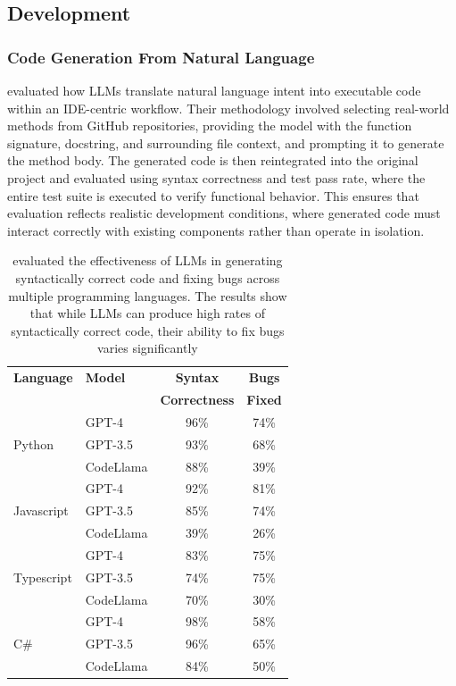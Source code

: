 \subsection{Development}
\subsubsection{Code Generation From Natural Language}
\citet{stages_dev_agarwal2024copilot} evaluated how LLMs translate natural language intent into executable code within an IDE-centric workflow. Their methodology involved selecting real-world methods from GitHub repositories, providing the model with the function signature, docstring, and surrounding file context, and prompting it to generate the method body. The generated code is then reintegrated into the original project and evaluated using syntax correctness and test pass rate, where the entire test suite is executed to verify functional behavior. This ensures that evaluation reflects realistic development conditions, where generated code must interact correctly with existing components rather than operate in isolation.
\begin{table}
    \centering
    \begin{tabular}{@{}llcc@{}}
        \\
        \toprule
        \textbf{Language}           & \textbf{Model} & \textbf{Syntax }     & \textbf{Bugs}  \\
                                    &                & \textbf{Correctness} & \textbf{Fixed} \\
        \toprule
        \multirow{3}{*}{Python}     & GPT-4          & 96\%                 & 74\%           \\&  GPT-3.5& 93\% & 68\%\\&CodeLlama & 88\% & 39\%\\
        \toprule
        \multirow{3}{*}{Javascript} & GPT-4          & 92\%                 & 81\%           \\&  GPT-3.5 & 85\% & 74\%\\&CodeLlama & 39\% & 26\%\\
        \toprule
        \multirow{3}{*}{Typescript} & GPT-4          & 83\%                 & 75\%           \\&  GPT-3.5 & 74\% & 75\%\\&CodeLlama & 70\% & 30\%\\
        \toprule
        \multirow{3}{*}{C\#}        & GPT-4          & 98\%                 & 58\%           \\&  GPT-3.5  & 96\% & 65\%\\&CodeLlama  & 84\% & 50\%\\
        \bottomrule
    \end{tabular}
    \caption{\citet{stages_dev_agarwal2024copilot} evaluated the effectiveness of LLMs in generating syntactically correct code and fixing bugs across multiple programming languages. The results show that while LLMs can produce high rates of syntactically correct code, their ability to fix bugs varies significantly}
    \label{tab:fix_results}
\end{table}

